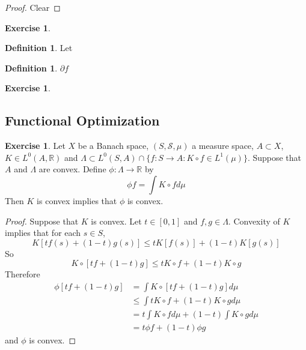 \documentclass[12pt]{amsart}
\theoremstyle{definition}
\newtheorem{defn}[definition]{Definition}
\theoremstyle{remark}
\theoremstyle{definition}
\newtheorem{ex}[definition]{Exercise}
\newcommand{\Lam}{\Lambda}
\newcommand{\R}{\mathbb{R}}
\newcommand{\MS}{\mathcal{S}}
\newcommand{\ui}{[0,1]}
\begin{document}
	\begin{proof}
	Clear
	\end{proof}
	
	\begin{ex}
	
	\end{ex}
	
	\newpage
	
	
	
	
	
	
	
	
	
	
	\begin{defn}
	Let 
	\end{defn}
	
	\begin{defn}
	$\partial f$
	\end{defn}	
	
	\begin{ex}
	
	\end{ex}
	
	
	\subsection{Functional Optimization}
	\begin{ex}
	Let $X$ be a Banach space, $(S, \MS, \mu)$ a measure space, $A \subset X$, $K \in L^0(A, \R)$ and $\Lam \subset L^0(S, A) \cap \{f:S \rightarrow A:  K \circ f \in L^1(\mu) \}$. Suppose that $A$ and $\Lam$ are convex. Define $\phi: \Lam \rightarrow \R$ by $$\phi f = \int K\circ f d \mu $$
	Then $K$ is convex implies that $\phi$ is convex. 
	\end{ex}	
	
	\begin{proof}
	Suppose that $K$ is convex. Let $t \in \ui$ and $f, g \in \Lam$. Convexity of $K$ implies that for each $s \in S$, $$K[tf(s) + (1-t)g(s)] \leq tK[f(s)] + (1-t)K[g(s)]$$ So $$K \circ [tf +(1-t)g] \leq t K \circ f + (1-t) K \circ g$$
	Therefore 
	\begin{align*}
	\phi[tf + (1-t) g]
	&= \int K \circ [tf +(1-t)g] d \mu \\
	& \leq  \int t K \circ f + (1-t) K \circ g d \mu \\
	&= t \int K \circ f d\mu + (1-t) \int K \circ g d \mu \\
	&= t \phi f + (1-t) \phi g
	\end{align*}
	and $\phi$ is convex.
	\end{proof}
	
\end{document}
